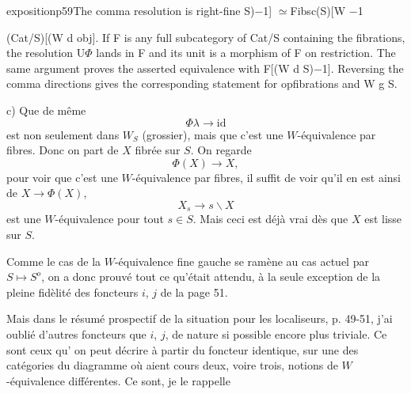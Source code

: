 \begin{dcomment}{exposition}{p59}{The comma resolution is right-fine}
S)\ensuremath{-}1] \ensuremath{\simeq}Fibsc(S)[W \ensuremath{-}1

(Cat/S)[(W d obj]. If F is any full subcategory of Cat/S containing the fibrations, the resolution U\ensuremath{\Phi} lands in F and its unit is a morphism of F on restriction. The same argument proves the asserted equivalence with F[(W d S)\ensuremath{-}1]. Reversing the comma directions gives the corresponding statement for opfibrations and W g S.

\end{dcomment}


c) Que de même
\[\Phi\lambda \longrightarrow \mathrm{id}\]
est non seulement dans $W_S$ (grossier), mais que c'est une $W$-équivalence par fibres. Donc on part de $X$ fibrée sur $S$. On regarde
\[\Phi(X) \longrightarrow X,\]
pour voir que c'est une $W$-équivalence par fibres, il suffit de voir qu'il en est ainsi de $X \longrightarrow \Phi(X)$,
\[X_s \longrightarrow s\backslash X\]
est une $W$-équivalence pour tout $s \in S$. Mais ceci est déjà vrai dès que $X$ est lisse sur $S$.

Comme le cas de la $W$-équivalence fine gauche se ramène au cas actuel par $S \longmapsto S^{o}$, on a donc prouvé tout ce qu'était attendu, à la seule exception de la pleine fidèlité des foncteurs $i$, $j$ de la page 51. %

Mais dans le résumé prospectif de la situation pour les localiseurs, p. 49-51, j'ai oublié d'autres foncteurs que $i$, $j$, de nature si possible encore plus triviale. Ce sont
ceux qu' on peut décrire à partir du foncteur identique, sur une des catégories du diagramme où aient cours deux, voire trois, notions de $W$-équivalence différentes. Ce sont, je le rappelle

